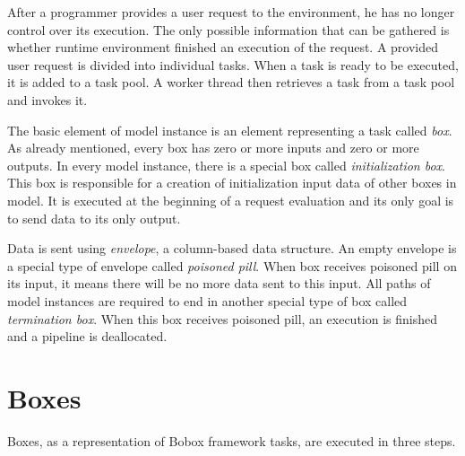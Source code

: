 After a programmer provides a user request to the environment, he has no longer control over its execution. The only possible information that can be gathered is whether runtime environment finished an execution of the request. A provided user request is divided into individual tasks. When a task is ready to be executed, it is added to a task pool. A worker thread then retrieves a task from a task pool and invokes it.

The basic element of model instance is an element representing a task called \emph{box}.  As already mentioned, every box has zero or more inputs and zero or more outputs. In every model instance, there is a special box called \emph{initialization box}. This box is responsible for a creation of initialization input data of other boxes in model. It is executed at the beginning of a request evaluation and its only goal is to send data to its only output.

Data is sent using \emph{envelope}, a column-based data structure. An empty envelope is a special type of envelope called \emph{poisoned pill}. When box receives poisoned pill on its input, it means there will be no more data sent to this input. All paths of model instances are required to end in another special type of box called \emph{termination box}. When this box receives poisoned pill, an execution is finished and a pipeline is deallocated.

\section{Boxes}
Boxes, as a representation of Bobox framework tasks, are executed in three steps.

